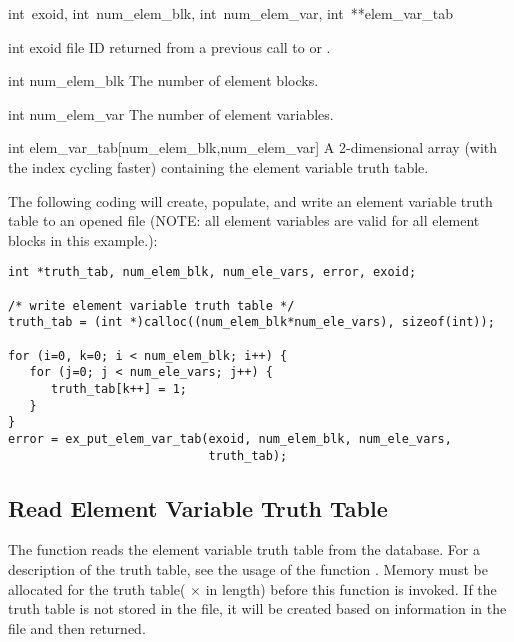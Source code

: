 {int~exoid,
int~num_elem_blk,
int~num_elem_var,
int~**elem_var_tab}

\begin{parameters}
\item[{int exoid \R{}}]
\exo{} file ID returned from a previous call to 
or .

\item[{int num_elem_blk \R{}}]
The number of element blocks.

\item[{int num_elem_var \R{}}]
The number of element variables.

\item[{int elem_var_tab[num_elem_blk,num_elem_var] \R{}}]
A 2-dimensional array (with the  index
cycling faster) containing the element variable truth table.

\end{parameters}
The following coding will create, populate, and write an
element variable truth table to an opened \exo{} file (NOTE:
all element variables are valid for all element blocks in this
example.):

\begin{lstlisting}
int *truth_tab, num_elem_blk, num_ele_vars, error, exoid;

/* write element variable truth table */
truth_tab = (int *)calloc((num_elem_blk*num_ele_vars), sizeof(int));

for (i=0, k=0; i < num_elem_blk; i++) {
   for (j=0; j < num_ele_vars; j++) {
      truth_tab[k++] = 1;
   }
}
error = ex_put_elem_var_tab(exoid, num_elem_blk, num_ele_vars,
                            truth_tab);
\end{lstlisting}

\subsection{Read Element Variable Truth Table}

The function  reads the \exo{} element
variable truth table from the database. For a description of the truth
table, see the usage of the function
. Memory must be allocated for
the truth table( $\times$  in length)
before this function is invoked. If the truth table is not stored in
the file, it will be created based on information in the file and then
returned.

